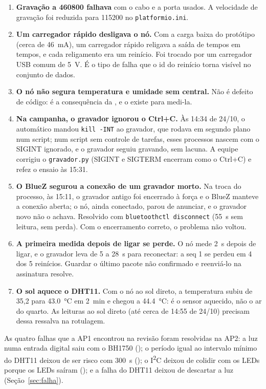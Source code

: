 \begin{enumerate}
  \item \textbf{Gravação a \SI{460800}{\baud} falhava} com o cabo e a porta
    usados. A velocidade de gravação foi reduzida para \SI{115200}{\baud}
    no \texttt{platformio.ini}.
  \item \textbf{Um carregador rápido desligava o nó.} Com a carga baixa do
    protótipo (cerca de \SI{46}{\milli\ampere}), um carregador rápido
    religava a saída de tempos em tempos, e cada religamento era um
    reinício. Foi trocado por um carregador USB comum de \SI{5}{\volt}. É
    o tipo de falha que o id do reinício torna visível no conjunto de
    dados.
  \item \textbf{O nó não segura temperatura e umidade sem central.} Não é
    defeito de código: é a consequência da , e o  existe para
    medi-la.
  \item \textbf{Na campanha, o gravador ignorou o Ctrl+C.} Às 14:34 de
    24/10, o  automático mandou \texttt{kill -INT} ao gravador,
    que rodava em segundo plano num script; num script sem controle de
    tarefas, esses processos nascem com o SIGINT ignorado, e o gravador
    seguiu gravando, sem lacuna. A equipe corrigiu o \texttt{gravador.py}
    (SIGINT e SIGTERM encerram como o Ctrl+C) e refez o ensaio às 15:31.
  \item \textbf{O BlueZ segurou a conexão de um gravador morto.} Na troca
    do processo, às 15:11, o gravador antigo foi encerrado à força e o
    BlueZ manteve a conexão aberta; o nó, ainda conectado, parou de
    anunciar, e o gravador novo não o achava. Resolvido com
    \texttt{bluetoothctl disconnect} (\SI{55}{\second} sem leitura, sem
    perda). Com o encerramento correto, o problema não voltou.
  \item \textbf{A primeira medida depois de ligar se perde.} O nó mede
    \SI{2}{\second} depois de ligar, e o gravador leva de 5 a \SI{28}{\second}
    para reconectar: a seq 1 se perdeu em 4 dos 5 reinícios. Guardar o
    último pacote não confirmado e reenviá-lo na assinatura resolve.
  \item \textbf{O sol aquece o DHT11.} Com o nó ao sol direto, a
    temperatura subiu de 35,2 para \SI{43.0}{\celsius} em \SI{2}{\minute}
    e chegou a \SI{44.4}{\celsius}: é o sensor aquecido, não o ar do quarto.
    As leituras ao sol direto (até cerca de 14:55 de 24/10) precisam
    dessa ressalva na rotulagem.
\end{enumerate}

As quatro falhas que a AP1 encontrou na revisão foram resolvidas na AP2:
a luz numa entrada digital saiu com o BH1750 (); o período igual ao
intervalo mínimo do DHT11 deixou de ser risco com \SI{300}{\second}
(); o I\textsuperscript{2}C deixou de colidir com os LEDs porque os
LEDs saíram (); e a falha do DHT11 deixou de descartar a luz
(Seção~\ref{sec:falha}).
